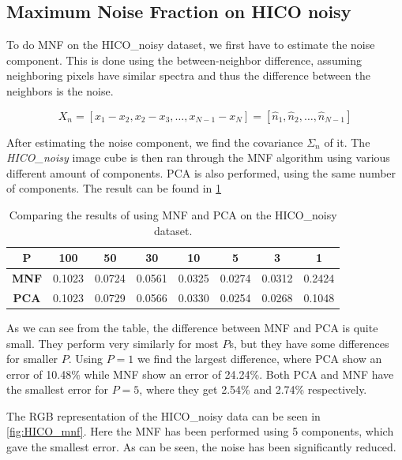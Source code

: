 \subsection{Maximum Noise Fraction on HICO noisy}

To do MNF on the HICO\_noisy dataset, we first have to estimate the noise component. This is 
done using the between-neighbor difference, assuming neighboring pixels have similar 
spectra and thus the difference between the neighbors is the noise. 

\begin{equation}
    X_n = [x_1 - x_2, x_2 - x_3, \dots, x_{N-1} - x_N] = [\hat{n}_1, \hat{n}_2, \dots, \hat{n}_{N-1}]
\end{equation}

After estimating the noise component, we find the covariance $\Sigma_n$ of it. The \textit{HICO\_noisy} 
image cube is then ran through the MNF algorithm using various different amount of components. PCA 
is also performed, using the same number of components. The result can be found in \cref{table:mnf_pca}

\begin{table}[h]
    \centering
    \begin{tabular}{c|ccccccc}
        \textbf{P}   & \textbf{100} & \textbf{50} & \textbf{30} & \textbf{10} & \textbf{5} & \textbf{3} & \textbf{1} \\ \hline
        \textbf{MNF} & 0.1023       & 0.0724      & 0.0561      & 0.0325      & 0.0274     & 0.0312     & 0.2424     \\
        \textbf{PCA} & 0.1023       & 0.0729      & 0.0566      & 0.0330      & 0.0254     & 0.0268     & 0.1048    
    \end{tabular} 
    \caption{Comparing the results of using MNF and PCA on the HICO\_noisy dataset.}
    \label{table:mnf_pca}
\end{table}

As we can see from the table, the difference between MNF and PCA is quite small. They perform very similarly 
for most $P$s, but they have some differences for smaller $P$. Using $P = 1$ we find the largest difference, 
where PCA show an error of 10.48\% while MNF show an error of 24.24\%. Both PCA and MNF have the smallest error 
for $P = 5$, where they get 2.54\% and 2.74\% respectively. 

The RGB representation of the HICO\_noisy data can be seen in \cref{fig:HICO_mnf}. Here the 
MNF has been performed using 5 components, which gave the smallest error. As can be seen, 
the noise has been significantly reduced. 

